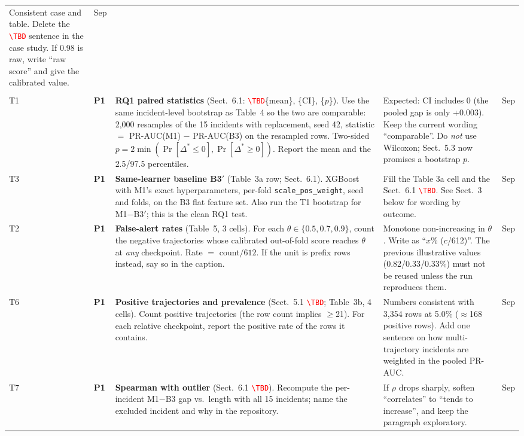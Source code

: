 \documentclass[11pt,a4paper]{article}
\newcommand{\pOne}{\textcolor{red!75!black}{\textbf{P1}}}
\newcommand{\tbd}{\textcolor{red}{\texttt{\textbackslash TBD}}}
\begin{document}
{\begin{longtable}{@{}>{\raggedright\arraybackslash}p{0.7cm}>{\raggedright\arraybackslash}p{0.6cm}>{\raggedright\arraybackslash}p{6.9cm}>{\raggedright\arraybackslash}p{5.6cm}>{\raggedright\arraybackslash}p{1.25cm}@{}}
Consistent case and table. Delete the \tbd{} sentence in the case study. If 0.98 is raw, write ``raw score'' and give the calibrated value. & 28 Sep \\
\multicolumn{5}{@{}l}{\textbf{B. Fill the placeholders (no new modelling beyond B3$'$)}}\\
T1 & \pOne & \textbf{RQ1 paired statistics} (Sect.~6.1: \tbd{}\{mean\}, \{CI\}, \{$p$\}). Use the same incident-level bootstrap as Table~4 so the two are comparable: 2{,}000 resamples of the 15 incidents with replacement, seed 42, statistic $=$ PR-AUC(M1) $-$ PR-AUC(B3) on the resampled rows. Two-sided $p=2\min(\Pr[\Delta^*\le0],\Pr[\Delta^*\ge0])$. Report the mean and the 2.5/97.5 percentiles. &
Expected: CI includes 0 (the pooled gap is only +0.003). Keep the current wording ``comparable''. Do \emph{not} use Wilcoxon; Sect.~5.3 now promises a bootstrap $p$. & 29 Sep \\
T3 & \pOne & \textbf{Same-learner baseline B3$'$} (Table~3a row; Sect.~6.1). XGBoost with M1's exact hyperparameters, per-fold \texttt{scale\_pos\_weight}, seed and folds, on the B3 flat feature set. Also run the T1 bootstrap for M1$-$B3$'$; this is the clean RQ1 test. &
Fill the Table 3a cell and the Sect.~6.1 \tbd{}. See Sect.~3 below for wording by outcome. & 29 Sep \\
T2 & \pOne & \textbf{False-alert rates} (Table~5, 3 cells). For each $\theta\in\{0.5,0.7,0.9\}$, count the negative trajectories whose calibrated out-of-fold score reaches $\theta$ at \emph{any} checkpoint. Rate $=$ count$/612$. If the unit is prefix rows instead, say so in the caption. &
Monotone non-increasing in $\theta$. Write as ``$x$\% ($c$/612)''. The previous illustrative values (0.82/0.33/0.33\%) must not be reused unless the run reproduces them. & 29 Sep \\
T6 & \pOne & \textbf{Positive trajectories and prevalence} (Sect.~5.1 \tbd{}; Table~3b, 4 cells). Count positive trajectories (the row count implies $\ge$21). For each relative checkpoint, report the positive rate of the rows it contains. &
Numbers consistent with 3{,}354 rows at 5.0\% ($\approx$168 positive rows). Add one sentence on how multi-trajectory incidents are weighted in the pooled PR-AUC. & 29 Sep \\
T7 & \pOne & \textbf{Spearman with outlier} (Sect.~6.1 \tbd{}). Recompute the per-incident M1$-$B3 gap vs.\ length with all 15 incidents; name the excluded incident and why in the repository. &
If $\rho$ drops sharply, soften ``correlates'' to ``tends to increase'', and keep the paragraph exploratory. & 29 Sep \\

\end{longtable}}
\end{document}
